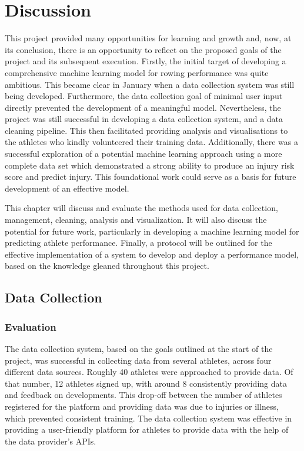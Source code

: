 \chapter{\label{ch:discussion}Discussion}
This project provided many opportunities for learning and growth and, now, at its conclusion, there is an opportunity to reflect on the proposed goals of the project and its subsequent execution. Firstly, the initial target of developing a comprehensive machine learning model for rowing performance was quite ambitious. This became clear in January when a data collection system was still being developed. Furthermore, the data collection goal of minimal user input directly prevented the development of a meaningful model. Nevertheless, the project was still successful in developing a data collection system, and a data cleaning pipeline. This then facilitated providing analysis and visualisations to the athletes who kindly volunteered their training data. Additionally, there was a successful exploration of a potential machine learning approach using a more complete data set which demonstrated a strong ability to produce an injury risk score and predict injury. This foundational work could serve as a basis for future development of an effective model. 

This chapter will discuss and evaluate the methods used for data collection, management, cleaning, analysis and visualization. It will also discuss the potential for future work, particularly in developing a machine learning model for predicting athlete performance. Finally, a protocol will be outlined for the effective implementation of a system to develop and deploy a performance model, based on the knowledge gleaned throughout this project.

\section{Data Collection}
\subsection{Evaluation}
The data collection system, based on the goals outlined at the start of the project, was successful in collecting data from several athletes, across four different data sources. Roughly 40 athletes were approached to provide data. Of that number, 12 athletes signed up, with around 8 consistently providing data and feedback on developments. This drop-off between the number of athletes registered for the platform and providing data was due to injuries or illness, which prevented consistent training. The data collection system was effective in providing a user-friendly platform for athletes to provide data with the help of the data provider's APIs. 

